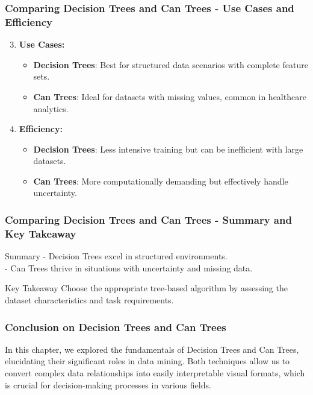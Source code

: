 \documentclass[aspectratio=169]{beamer}
\begin{document}
\begin{frame}[fragile]
    \frametitle{Comparing Decision Trees and Can Trees - Use Cases and Efficiency}
     
    \begin{enumerate}
        \setcounter{enumi}{2} %
        \item \textbf{Use Cases:}
            \begin{itemize}
                \item \textbf{Decision Trees}: Best for structured data scenarios with complete feature sets.
                \item \textbf{Can Trees}: Ideal for datasets with missing values, common in healthcare analytics.
            \end{itemize}
        \item \textbf{Efficiency:}
            \begin{itemize}
                \item \textbf{Decision Trees}: Less intensive training but can be inefficient with large datasets.
                \item \textbf{Can Trees}: More computationally demanding but effectively handle uncertainty.
            \end{itemize}    
    \end{enumerate}
\end{frame}

\begin{frame}[fragile]
    \frametitle{Comparing Decision Trees and Can Trees - Summary and Key Takeaway}
    
    \begin{block}{Summary}
        - Decision Trees excel in structured environments. \\
        - Can Trees thrive in situations with uncertainty and missing data.
    \end{block}
    
    \begin{block}{Key Takeaway}
        Choose the appropriate tree-based algorithm by assessing the dataset characteristics and task requirements.
    \end{block}
\end{frame}

\begin{frame}[fragile]
    \frametitle{Conclusion on Decision Trees and Can Trees}
    In this chapter, we explored the fundamentals of Decision Trees and Can Trees, elucidating their significant roles in data mining. 
    Both techniques allow us to convert complex data relationships into easily interpretable visual formats, which is crucial for decision-making processes in various fields.
\end{frame}
\end{document}
